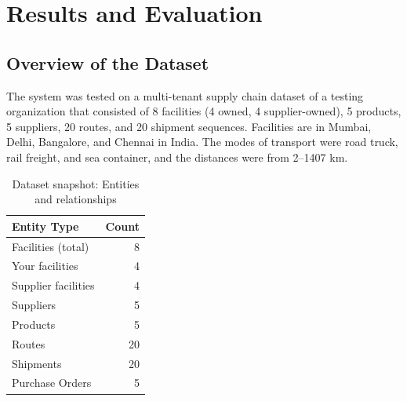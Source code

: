 \documentclass[conference]{IEEEtran}
\begin{document}
\section{Results and Evaluation}
\subsection{Overview of the Dataset}
The system was tested on a multi-tenant supply chain dataset of a testing organization that consisted of 8 facilities (4 owned, 4 supplier-owned), 5 products, 5 suppliers, 20 routes, and 20 shipment sequences. Facilities are in Mumbai, Delhi, Bangalore, and Chennai in India. The modes of transport were road truck, rail freight, and sea container, and the distances were from 2--1407 km.

\begin{table}[!t]
\centering
\caption{Dataset snapshot: Entities and relationships}
\small
\begin{tabular}{@{}lr@{}}
\toprule
\textbf{Entity Type} & \textbf{Count} \\
\midrule
Facilities (total) & 8 \\
\quad Your facilities & 4 \\
\quad Supplier facilities & 4 \\
Suppliers & 5 \\
Products & 5 \\
Routes & 20 \\
Shipments & 20 \\
Purchase Orders & 5 \\
\bottomrule
\end{tabular}
\label{tab:dataset}
\end{table}
\end{document}
